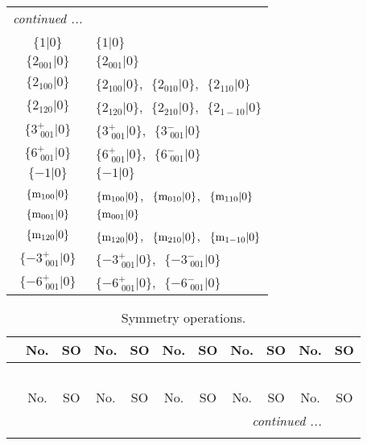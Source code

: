 \documentclass[fleqn,10pt,landscape]{article}
\begin{document}
\begin{itemize}
\begin{center}
\begin{longtable}{c|l}
 \hline \hline
\multicolumn{1}{r}{\footnotesize\it continued ...} \\ \endfoot

 \hline \hline
\multicolumn{1}{r}{} \\ \endlastfoot

$\{1|0\}$ & $\{1|0\}$ \\ \hline
$\{2{}_{001}|0\}$ & $\{2{}_{001}|0\}$ \\ \hline
$\{2{}_{100}|0\}$ & $\{2{}_{100}|0\}$,\,\, $\{2{}_{010}|0\}$,\,\, $\{2{}_{110}|0\}$ \\ \hline
$\{2{}_{120}|0\}$ & $\{2{}_{120}|0\}$,\,\, $\{2{}_{210}|0\}$,\,\, $\{2{}_{1-10}|0\}$ \\ \hline
$\{3^{+}_{\,\,001}|0\}$ & $\{3^{+}_{\,\,001}|0\}$,\,\, $\{3^{-}_{\,\,001}|0\}$ \\ \hline
$\{6^{+}_{\,\,001}|0\}$ & $\{6^{+}_{\,\,001}|0\}$,\,\, $\{6^{-}_{\,\,001}|0\}$ \\ \hline
$\{-1|0\}$ & $\{-1|0\}$ \\ \hline
$\{{\rm m}_{100}|0\}$ & $\{{\rm m}_{100}|0\}$,\,\, $\{{\rm m}_{010}|0\}$,\,\, $\{{\rm m}_{110}|0\}$ \\ \hline
$\{{\rm m}_{001}|0\}$ & $\{{\rm m}_{001}|0\}$ \\ \hline
$\{{\rm m}_{120}|0\}$ & $\{{\rm m}_{120}|0\}$,\,\, $\{{\rm m}_{210}|0\}$,\,\, $\{{\rm m}_{1-10}|0\}$ \\ \hline
$\{-3^{+}_{\,\,001}|0\}$ & $\{-3^{+}_{\,\,001}|0\}$,\,\, $\{-3^{-}_{\,\,001}|0\}$ \\ \hline
$\{-6^{+}_{\,\,001}|0\}$ & $\{-6^{+}_{\,\,001}|0\}$,\,\, $\{-6^{-}_{\,\,001}|0\}$ \\
\end{longtable}
\end{center}
\begin{center}
\renewcommand{\arraystretch}{1.3}
\begin{longtable}{c|cc|cc|cc|cc|cc}
\caption{Symmetry operations.}
 \\
 \hline \hline
 & No. & SO & No. & SO & No. & SO & No. & SO & No. & SO \\ \hline \endfirsthead

\multicolumn{10}{l}{\tablename\ \thetable{}} \\
 \hline \hline
 & No. & SO & No. & SO & No. & SO & No. & SO & No. & SO \\ \hline \endhead

 \hline \hline
\multicolumn{10}{r}{\footnotesize\it continued ...} \\ \endfoot


\end{longtable}
\end{center}
\end{itemize}
\end{document}
